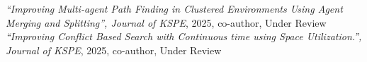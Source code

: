 \noindent
\textit{“Improving Multi-agent Path Finding in Clustered Environments Using Agent Merging and Splitting”, Journal of KSPE}, 2025, co-author, Under Review \\[0.3em]
\textit{“Improving Conflict Based Search with Continuous time using Space Utilization.”, Journal of KSPE}, 2025, co-author, Under Review